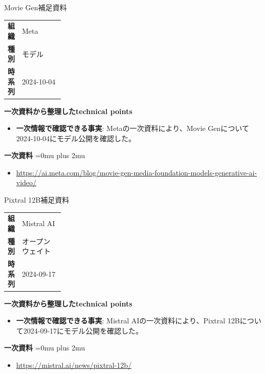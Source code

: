 \begin{technicalnote}{Movie Gen}{補足資料}
\begingroup
\begin{tabularx}{\linewidth}{@{}>{\bfseries}p{0.22\linewidth}X@{}}
組織 & Meta \\
種別 & モデル \\
時系列 & 2024-10-04 \\
\end{tabularx}
\smallskip
{\bfseries 一次資料から整理したtechnical points}
\begin{itemize}[leftmargin=1.5em,itemsep=0.35em]
\item \textbf{一次情報で確認できる事実}: Metaの一次資料により、Movie Genについて2024-10-04にモデル公開を確認した。
\end{itemize}
\begin{minipage}{\linewidth}
\begin{samepage}
{\bfseries 一次資料}
\begingroup\sloppy
\Urlmuskip=0mu plus 2mu\relax
\begin{itemize}[leftmargin=1.5em,itemsep=0.25em]
\item {\scriptsize\url{https://ai.meta.com/blog/movie-gen-media-foundation-models-generative-ai-video/}}
\end{itemize}
\endgroup
\end{samepage}
\end{minipage}
\endgroup
\end{technicalnote}
\medskip

\begin{technicalnote}{Pixtral 12B}{補足資料}
\begingroup
\begin{tabularx}{\linewidth}{@{}>{\bfseries}p{0.22\linewidth}X@{}}
組織 & Mistral AI \\
種別 & オープンウェイト \\
時系列 & 2024-09-17 \\
\end{tabularx}
\smallskip
{\bfseries 一次資料から整理したtechnical points}
\begin{itemize}[leftmargin=1.5em,itemsep=0.35em]
\item \textbf{一次情報で確認できる事実}: Mistral AIの一次資料により、Pixtral 12Bについて2024-09-17にモデル公開を確認した。
\end{itemize}
\begin{minipage}{\linewidth}
\begin{samepage}
{\bfseries 一次資料}
\begingroup\sloppy
\Urlmuskip=0mu plus 2mu\relax
\begin{itemize}[leftmargin=1.5em,itemsep=0.25em]
\item {\scriptsize\url{https://mistral.ai/news/pixtral-12b/}}
\end{itemize}
\endgroup
\end{samepage}
\end{minipage}
\endgroup
\end{technicalnote}
\medskip

